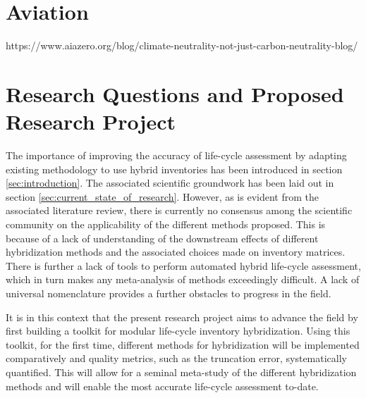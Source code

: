 \documentclass{article}
\begin{document}
    
        
        
    
\section{Aviation}

https://www.aiazero.org/blog/climate-neutrality-not-just-carbon-neutrality-blog/
    
\section{Research Questions and Proposed Research Project}
    
    The importance of improving the accuracy of life-cycle assessment by adapting existing methodology to use hybrid inventories has been introduced in section \ref{sec:introduction}. The associated scientific groundwork has been laid out in section \ref{sec:current_state_of_research}. However, as is evident from the associated literature review, there is currently no consensus among the scientific community on the applicability of the different methods proposed. This is because of a lack of understanding of the downstream effects of different hybridization methods and the associated choices made on inventory matrices. There is further a lack of tools to perform automated hybrid life-cycle assessment, which in turn makes any meta-analysis of methods exceedingly difficult. A lack of universal nomenclature provides a further obstacles to progress in the field. 
    
    It is in this context that the present research project aims to advance the field by first building a toolkit for modular life-cycle inventory hybridization. Using this toolkit, for the first time, different methods for hybridization will be implemented comparatively and quality metrics, such as the truncation error, systematically quantified. This will allow for a seminal meta-study of the different hybridization methods and will enable the most accurate life-cycle assessment to-date.
    
\end{document}
